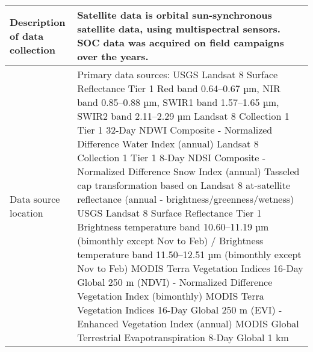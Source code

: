 \documentclass[times,final]{elsarticle.cls}
\begin{document}
{\begin{longtable}{|p{33mm}|p{94mm}|}
\hline
Description of          
data\newline 
collection             & Satellite data is orbital sun-synchronous satellite data,                          using multispectral sensors. SOC data was acquired on field                          campaigns over the years. \\
\hline                         
Data source location   & Primary data sources:  \newline
                        \newline
                        USGS Landsat 8 Surface Reflectance Tier 1
                        Red band 0.64–0.67 µm, NIR band 0.85–0.88 µm,
                        SWIR1 band 1.57–1.65 µm, SWIR2 band 2.11–2.29 µm \newline 
                        \newline
                        Landsat 8 Collection 1 Tier 1 32-Day NDWI Composite - Normalized Difference Water Index (annual)
                        \newline \newline
                        Landsat 8 Collection 1 Tier 1 8-Day NDSI Composite - Normalized Difference Snow Index (annual)
                        \newline \newline
                        Tasseled cap transformation based on Landsat 8 at-satellite reflectance (annual - brightness/greenness/wetness)
                        \newline \newline
                    	USGS Landsat 8 Surface Reflectance Tier 1
                        Brightness temperature band 10.60–11.19 µm (bimonthly except Nov to Feb) / 
                       Brightness temperature band 11.50–12.51 µm (bimonthly except Nov to Feb)
                        \newline\newline
                        MODIS Terra Vegetation Indices 16-Day Global 250 m (NDVI) - Normalized Difference Vegetation Index (bimonthly)
                        \newline \newline
                    	MODIS Terra Vegetation Indices 16-Day Global 250 m (EVI) - Enhanced Vegetation Index (annual)
                    	\newline \newline
                    	MODIS Global Terrestrial Evapotranspiration 8-Day Global 1 km
                    	\newline \newline

\end{longtable}}
\end{document}
